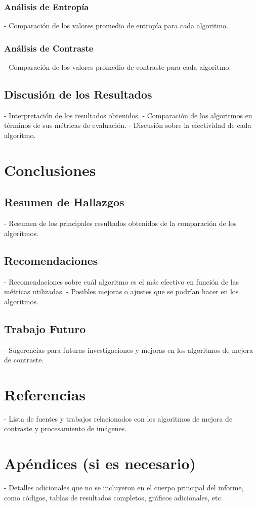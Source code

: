\documentclass[sigchi]{acmart}
\begin{document}
\subsubsection{Análisis de Entropía}
- Comparación de los valores promedio de entropía para cada algoritmo.

\subsubsection{Análisis de Contraste}
- Comparación de los valores promedio de contraste para cada algoritmo.

\subsection{Discusión de los Resultados}
- Interpretación de los resultados obtenidos.
- Comparación de los algoritmos en términos de sus métricas de evaluación.
- Discusión sobre la efectividad de cada algoritmo.

\section{Conclusiones}
\subsection{Resumen de Hallazgos}
- Resumen de los principales resultados obtenidos de la comparación de los algoritmos.

\subsection{Recomendaciones}
- Recomendaciones sobre cuál algoritmo es el más efectivo en función de las métricas utilizadas.
- Posibles mejoras o ajustes que se podrían hacer en los algoritmos.

\subsection{Trabajo Futuro}
- Sugerencias para futuras investigaciones y mejoras en los algoritmos de mejora de contraste.

\section{Referencias}
- Lista de fuentes y trabajos relacionados con los algoritmos de mejora de contraste y procesamiento de imágenes.

\section{Apéndices (si es necesario)}
- Detalles adicionales que no se incluyeron en el cuerpo principal del informe, como códigos, tablas de resultados completos, gráficos adicionales, etc.

\nocite{*} %


\end{document}
